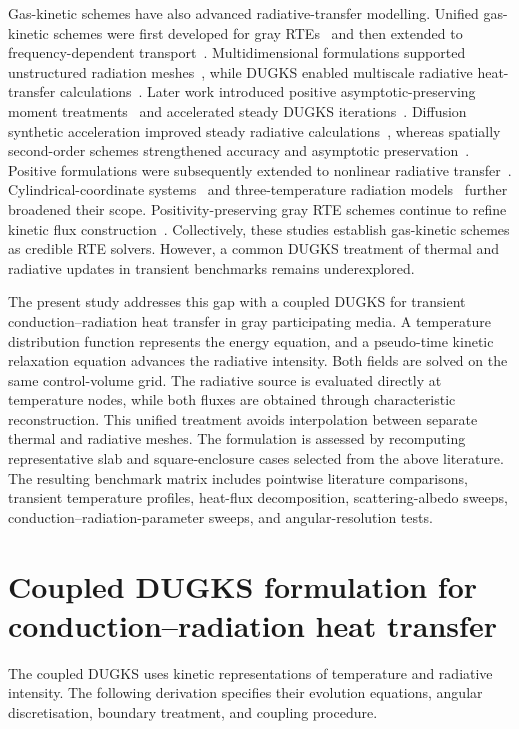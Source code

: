 \documentclass[a4paper,12pt]{ctexart}
\numberwithin{equation}{section}
\newcounter{procedure}
\begin{document}
Gas-kinetic schemes have also advanced radiative-transfer modelling. Unified gas-kinetic schemes were first developed for gray RTEs~\cite{SunJiangXu2015} and then extended to frequency-dependent transport~\cite{Sun2015Frequency}. Multidimensional formulations supported unstructured radiation meshes~\cite{Sun2017}, while DUGKS enabled multiscale radiative heat-transfer calculations~\cite{Luo2018}. Later work introduced positive asymptotic-preserving moment treatments~\cite{Xu2021} and accelerated steady DUGKS iterations~\cite{Song2022}. Diffusion synthetic acceleration improved steady radiative calculations~\cite{Song2023}, whereas spatially second-order schemes strengthened accuracy and asymptotic preservation~\cite{Xu2023}. Positive formulations were subsequently extended to nonlinear radiative transfer~\cite{Xu2024,Song2025}. Cylindrical-coordinate systems~\cite{Wang2025Cyl} and three-temperature radiation models~\cite{Li2025} further broadened their scope. Positivity-preserving gray RTE schemes continue to refine kinetic flux construction~\cite{Wang2026}. Collectively, these studies establish gas-kinetic schemes as credible RTE solvers. However, a common DUGKS treatment of thermal and radiative updates in transient benchmarks remains underexplored.

The present study addresses this gap with a coupled DUGKS for transient conduction--radiation heat transfer in gray participating media. A temperature distribution function represents the energy equation, and a pseudo-time kinetic relaxation equation advances the radiative intensity. Both fields are solved on the same control-volume grid. The radiative source is evaluated directly at temperature nodes, while both fluxes are obtained through characteristic reconstruction. This unified treatment avoids interpolation between separate thermal and radiative meshes. The formulation is assessed by recomputing representative slab and square-enclosure cases selected from the above literature. The resulting benchmark matrix includes pointwise literature comparisons, transient temperature profiles, heat-flux decomposition, scattering-albedo sweeps, conduction--radiation-parameter sweeps, and angular-resolution tests.

\section{Coupled DUGKS formulation for conduction--radiation heat transfer}
\label{sec:coupled_dugks}

The coupled DUGKS uses kinetic representations of temperature and radiative intensity. The following derivation specifies their evolution equations, angular discretisation, boundary treatment, and coupling procedure.
\end{document}
